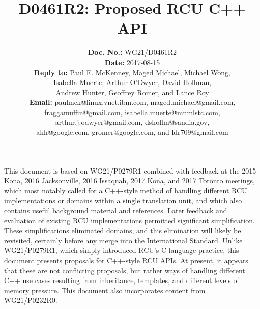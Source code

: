 \documentclass[letterpaper,10pt]{article}
\begin{document}
\newcommand{\co}[1]{\lstinline[breaklines=yes,breakatwhitespace=yes]{#1}}

\title{D0461R2: Proposed RCU C++ API}

\author{
{\bf Doc. No.: } WG21/D0461R2 \\
{\bf Date: } 2017-08-15 \\
{\bf Reply to: } Paul E. McKenney, Maged Michael, Michael Wong,\\
Isabella Muerte, Arthur O'Dwyer, David Hollman, \\
Andrew Hunter, Geoffrey Romer, and Lance Roy \\
{\bf Email: } paulmck@linux.vnet.ibm.com, maged.michael@gmail.com, \\
fraggamuffin@gmail.com, isabella.muerte@mnmlstc.com, \\
arthur.j.odwyer@gmail.com, dshollm@sandia.gov, \\
ahh@google.com, gromer@google.com, and ldr709@gmail.com
} %


\pagestyle{myheadings}

\maketitle


This document is based on WG21/P0279R1 combined with feedback at
the 2015 Kona, 2016 Jacksonville, 2016 Issaquah, 2017 Kona, and
2017 Toronto meetings, which most notably called
for a C++-style method of handling different RCU implementations or
domains within a single translation unit, and which also contains
useful background material and references.
Later feedback and evaluation of existing RCU implementations permitted
significant simplification.
These simplifications eliminated domains, and this elimination will
likely be revisited, certainly before any merge into the International
Standard.
Unlike WG21/P0279R1, which simply introduced RCU's C-language practice,
this document presents proposals for C++-style RCU APIs.
At present, it appears that these are not conflicting proposals, but
rather ways of handling different C++ use cases resulting from
inheritance, templates, and different levels of memory pressure.
This document also incorporates content from
WG21/P0232R0\cite{PaulEMcKennneyToolKitP0232R0}.
\end{document}
